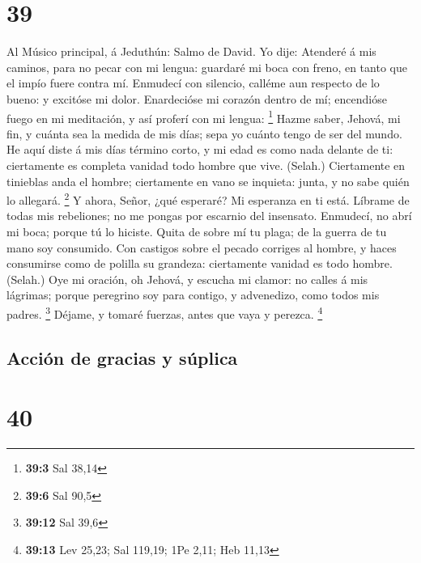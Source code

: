 \hypertarget{section-38}{%
\section{39}\label{section-38}}

 Al Músico principal, á Jeduthún: Salmo de David. Yo dije:
Atenderé á mis caminos, para no pecar con mi lengua: guardaré mi boca
con freno, en tanto que el impío fuere contra mí.  Enmudecí
con silencio, calléme aun respecto de lo bueno: y excitóse mi dolor.
 Enardecióse mi corazón dentro de mí; encendióse fuego en mi
meditación, y así proferí con mi lengua: \footnote{\textbf{39:3} Sal
  38,14}  Hazme saber, Jehová, mi fin, y cuánta sea la
medida de mis días; sepa yo cuánto tengo de ser del mundo. 
He aquí diste á mis días término corto, y mi edad es como nada delante
de ti: ciertamente es completa vanidad todo hombre que vive. (Selah.)
 Ciertamente en tinieblas anda el hombre; ciertamente en
vano se inquieta: junta, y no sabe quién lo allegará. \footnote{\textbf{39:6}
  Sal 90,5}  Y ahora, Señor, ¿qué esperaré? Mi esperanza en
ti está.  Líbrame de todas mis rebeliones; no me pongas por
escarnio del insensato.  Enmudecí, no abrí mi boca; porque
tú lo hiciste.  Quita de sobre mí tu plaga; de la guerra de
tu mano soy consumido.  Con castigos sobre el pecado
corriges al hombre, y haces consumirse como de polilla su grandeza:
ciertamente vanidad es todo hombre. (Selah.)  Oye mi
oración, oh Jehová, y escucha mi clamor: no calles á mis lágrimas;
porque peregrino soy para contigo, y advenedizo, como todos mis padres.
\footnote{\textbf{39:12} Sal 39,6}  Déjame, y tomaré
fuerzas, antes que vaya y perezca. \footnote{\textbf{39:13} Lev 25,23;
  Sal 119,19; 1Pe 2,11; Heb 11,13}

\hypertarget{acciuxf3n-de-gracias-y-suxfaplica}{%
\subsection{Acción de gracias y
súplica}\label{acciuxf3n-de-gracias-y-suxfaplica}}

\hypertarget{section-39}{%
\section{40}\label{section-39}}

